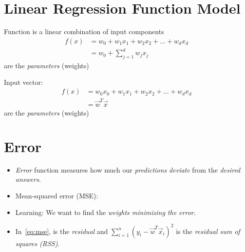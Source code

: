 \documentclass[
	number={5},
	title={Linear Regression}
]{cs584notes}
\begin{document}
\section{Linear Regression Function Model}\label{sec:linear-regression-function-model}
Function  is a linear combination of input components
\begin{equation*}
\begin{aligned}
	f(x) &= w_{0} + w_{1}x_{1} + w_{2}x_{2} + \dots + w_{d}x_{d}\\
		 &= w_{0} + \sum_{j=1}^{d} w_{j}x_{j}
\end{aligned}
\end{equation*}
 are the \emph{parameters} (weights)

Input vector: 
\begin{equation*}
\begin{aligned}
	f(x) &= w_{0}x_{0} + w_{1}x_{1} + w_{2}x_{2} + \dots + w_{d}x_{d}\\
		 &= \vec{w}^{T}\vec{x}
\end{aligned}
\end{equation*}
 are the \emph{parameters} (weights)

\section{Error}\label{sec:error}
\begin{itemize}
	\item \emph{Error} function measures how much our \emph{predictions deviate} from the \emph{desired answers}.
	\item Mean-squared error (MSE):
	\item Learning: We want to find the \emph{weights minimizing the error}.
	\item In~\eqref{eq:mse},  is the \emph{residual\label{dfn:residual}} and $\sum_{i=1}^{n} (y_{i} - \vec{w}^{T}\vec{x}_{i})^{2}$ is the \emph{residual sum of squares (RSS)}.
\end{itemize}
\end{document}

